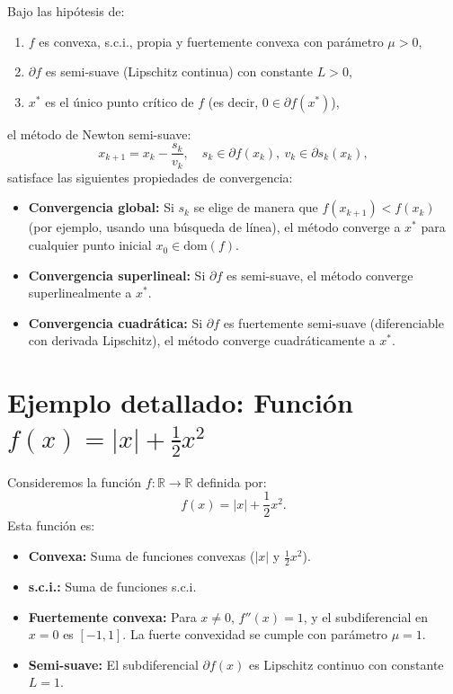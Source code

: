 \documentclass[12pt]{book}
\theoremstyle{definition}
\theoremstyle{plain}
\theoremstyle{remark}
\begin{document}
Bajo las hipótesis de:
\begin{enumerate}
    \item \( f \) es convexa, s.c.i., propia y fuertemente convexa con parámetro \( \mu > 0 \),
    \item \( \partial f \) es semi-suave (Lipschitz continua) con constante \( L > 0 \),
    \item \( x^* \) es el único punto crítico de \( f \) (es decir, \( 0 \in \partial f(x^*) \)),
\end{enumerate}
el método de Newton semi-suave:
\[
x_{k+1} = x_k - \frac{s_k}{v_k}, \quad s_k \in \partial f(x_k), \ v_k \in \partial s_k(x_k),
\]
satisface las siguientes propiedades de convergencia:
\begin{itemize}
    \item \textbf{Convergencia global:} Si \( s_k \) se elige de manera que \( f(x_{k+1}) < f(x_k) \) (por ejemplo, usando una búsqueda de línea), el método converge a \( x^* \) para cualquier punto inicial \( x_0 \in \text{dom}(f) \).
    \item \textbf{Convergencia superlineal:} Si \( \partial f \) es semi-suave, el método converge superlinealmente a \( x^* \).
    \item \textbf{Convergencia cuadrática:} Si \( \partial f \) es fuertemente semi-suave (diferenciable con derivada Lipschitz), el método converge cuadráticamente a \( x^* \).
\end{itemize}

\section*{Ejemplo detallado: Función \( f(x) = |x| + \frac{1}{2} x^2 \)}

Consideremos la función \( f: \mathbb{R} \to \mathbb{R} \) definida por:
\[
f(x) = |x| + \frac{1}{2} x^2.
\]
Esta función es:
\begin{itemize}
    \item \textbf{Convexa:} Suma de funciones convexas (\( |x| \) y \( \frac{1}{2}x^2 \)).
    \item \textbf{s.c.i.:} Suma de funciones s.c.i.
    \item \textbf{Fuertemente convexa:} Para \( x \neq 0 \), \( f''(x) = 1 \), y el subdiferencial en \( x = 0 \) es \([-1, 1]\). La fuerte convexidad se cumple con parámetro \( \mu = 1 \).
    \item \textbf{Semi-suave:} El subdiferencial \( \partial f(x) \) es Lipschitz continuo con constante \( L = 1 \).
\end{itemize}
\end{document}
